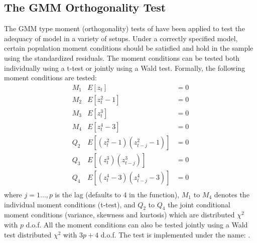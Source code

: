 \subsection{The GMM Orthogonality Test}
The GMM type moment (orthogonality) tests of \cite{Hansen1982} have been applied
to test the adequacy of model in a variety of setups. Under a correctly
specified model, certain population moment conditions should be satisfied and
hold in the sample using the standardized residuals. The moment conditions can
be tested both individually using a t-test or jointly using a Wald test. Formally,
the following moment conditions are tested:
\begin{equation}\label{eq:gmm}
\begin{array}{*{20}{c}}
{{M_1}}&{E\left[ {{z_t}} \right]}&{ = 0}\\
{{M_2}}&{E\left[ {z_t^2 - 1} \right]}&{ = 0}\\
{{M_3}}&{E\left[ {z_t^3} \right]}&{ = 0}\\
{{M_4}}&{E\left[ {z_t^4 - 3} \right]}&{ = 0}\\
{{Q_2}}&{E\left[ {\left( {z_t^2 - 1} \right)\left( {z_{t - j}^2 - 1} \right)} \right]}&{ = 0}\\
{{Q_3}}&{E\left[ {\left( {z_t^3} \right)\left( {z_{t - j}^3} \right)} \right]}&{ = 0}\\
{{Q_4}}&{E\left[ {\left( {z_t^4 - 3} \right)\left( {z_{t - j}^4 - 3} \right)} \right]}&{ = 0}\\
\end{array}
\end{equation}
where $j=1\dots,p$ is the lag (defaults to 4 in the function), $M_1$ to $M_4$ denotes the individual moment conditions (t-test),
and $Q_2$ to $Q_4$ the joint conditional moment conditions (variance, skewness and kurtosis) which are distributed $\chi^2$ with $p$ d.o.f. All the
moment conditions can also be tested jointly using a Wald test distributed $\chi^2$ with $3p+4$ d.o.f. The test is implemented under the name: \verb@GMMTest@.
